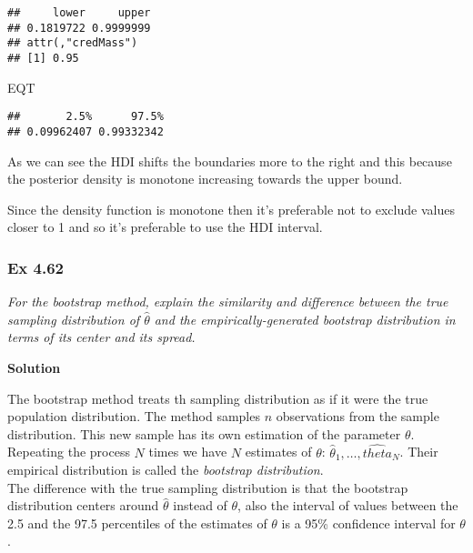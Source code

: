 \documentclass[
]{article}
\newenvironment{Shaded}{\begin{snugshade}}{\end{snugshade}}
\newcommand{\NormalTok}[1]{#1}
\begin{document}
\begin{verbatim}
##     lower     upper 
## 0.1819722 0.9999999 
## attr(,"credMass")
## [1] 0.95
\end{verbatim}

\begin{Shaded}
\begin{Highlighting}[]
\NormalTok{EQT}
\end{Highlighting}
\end{Shaded}

\begin{verbatim}
##       2.5%      97.5% 
## 0.09962407 0.99332342
\end{verbatim}

As we can see the HDI shifts the boundaries more to the right and this
because the posterior density is monotone increasing towards the upper
bound.

Since the density function is monotone then it's preferable not to
exclude values closer to 1 and so it's preferable to use the HDI
interval.

\hypertarget{ex-4.62}{%
\subsubsection{Ex 4.62}\label{ex-4.62}}

\emph{For the bootstrap method, explain the similarity and difference
between the true sampling distribution of \(\hat{\theta}\) and the
empirically-generated bootstrap distribution in terms of its center and
its spread.}

\textbf{Solution}

The bootstrap method treats th sampling distribution as if it were the
true population distribution. The method samples \(n\) observations from
the sample distribution. This new sample has its own estimation of the
parameter \(\theta\). Repeating the process \(N\) times we have \(N\)
estimates of \(\theta\): \(\hat{\theta}_1, \dots, \hat{theta}_N\). Their
empirical distribution is called the \emph{bootstrap distribution}.\\
The difference with the true sampling distribution is that the bootstrap
distribution centers around \(\hat{\theta}\) instead of \(\theta\), also
the interval of values between the 2.5 and the 97.5 percentiles of the
estimates of \(\theta\) is a 95\% confidence interval for \(\theta\).
\end{document}
